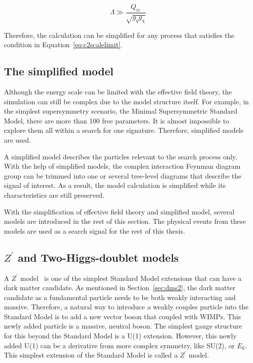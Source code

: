 \begin{equation}
  \Lambda \gg \frac{Q_{tr}}{\sqrt{g_{q}g_{\chi}}}
  \label{eq:c2scalelimit}
\end{equation}

Therefore, the calculation can be simplified for any process that satisfies the condition in Equation~\ref{eq:c2scalelimit}.

\subsection{The simplified model}
\par Although the energy scale can be limited with the effective field theory, the simulation can still be complex due to the model structure itself. For example, in the simplest supersymmetry scenario, the Minimal Supersymmetric Standard Model, there are more than 100 free parameters. It is almost impossible to explore them all within a search for one signature. Therefore, simplified models~\cite{SimplifiedModels-Alves2012} are used.

\par A simplified model describes the particles relevant to the search process only. With the help of simplified models, the complex interaction Feynman diagram group can be trimmed into one or several tree-level diagrams that describe the signal of interest. As a result, the model calculation is simplified while its characteristics are still preserved. 

\par With the simplification of effective field theory and simplified model, several models are introduced in the rest of this section. The physical events from these models are used as a search signal for the rest of this thesis.

\subsection{$Z^{\prime}$ and Two-Higgs-doublet models}
\par A $Z^{\prime}$ model~\cite{He:1991qd} is one of the simplest Standard Model extensions that can have a dark matter candidate. As mentioned in Section~\ref{sec:dms2}, the dark matter candidate as a fundamental particle needs to be both weakly interacting and massive. Therefore, a natural way to introduce a weakly couples particle into the Standard Model is to add a new vector boson that coupled with WIMPs. This newly added particle is a massive, neutral boson. The simplest gauge structure for this beyond the Standard Model is a U(1) extension. However, this newly added U(1) can be a derivative from more complex symmetry, like SU(2), or $E_{6}$. This simplest extension of the Standard Model is called a $Z^{\prime}$ model.


